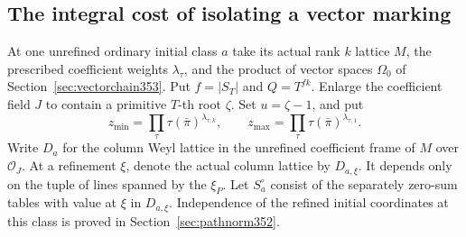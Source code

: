 \documentclass[a4paper,11pt]{article}
\theoremstyle{definition}
\theoremstyle{remark}
\numberwithin{equation}{section}
\begin{document}
\subsection{The integral cost of isolating a vector marking}\label{sec:pointlattice353}

At one unrefined ordinary initial class \(a\) take its actual
rank \(k\) lattice \(M\), the prescribed coefficient weights
\(\lambda_\tau\), and the product of vector spaces \(\Omega_0\)
of Section~\ref{sec:vectorchain353}. Put \(f=|S_T|\) and
\(Q=T^{fk}\). Enlarge the coefficient field \(J\) to contain a
primitive \(T\)-th root \(\zeta\). Set \(u=\zeta-1\), and put
\[
 z_{\min}=\prod_\tau\tau(\bar\pi)^{\lambda_{\tau,k}},
 \qquad z_{\max}=\prod_\tau\tau(\bar\pi)^{\lambda_{\tau,1}} .
\]
Write \(D_a\) for the column Weyl lattice in the unrefined
coefficient frame of \(M\) over \(\mathcal O_J\). At a refinement
\(\xi\), denote the actual column lattice by \(D_{a,\xi}\).
It depends only on the tuple of lines spanned by the \(\xi_P\).
Let \(S_a^\circ\) consist of the separately zero-sum tables
with value at \(\xi\) in \(D_{a,\xi}\). Independence of the
refined initial coordinates at this class is proved in
Section~\ref{sec:pathnorm352}.
\end{document}
